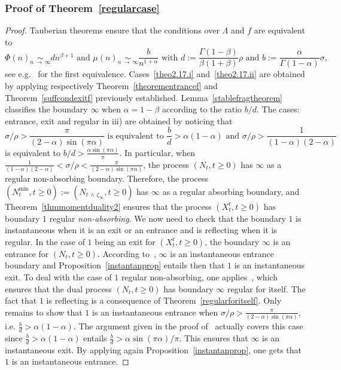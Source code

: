 \documentclass[10pt]{amsart}
\theoremstyle{definition}\newtheorem{defi}[theo]{Definition}\newtheorem{rema}[theo]{Remark}\newtheorem{exam}[theo]{Example}\newtheorem{exem}[theo]{Example}\newtheorem{nota}[theo]{Notation}
\newcommand{\rmr}{\mathrm{r}}
\begin{document}
\subsubsection{Proof of Theorem~\ref{regularcase}}
\begin{proof}
Tauberian theorems ensure that the conditions over $\Lambda$ and $f$ are equivalent to
\[
\Phi(n)\underset{n\,\rightarrow\,\infty}{\sim} d n^{\beta+1}
\text{ and }
\mu(n)\underset{n\,\rightarrow\,\infty}{\sim} \frac{b}{n^{1+\alpha}}\text{ with }d:=\frac{\Gamma(1-\beta)}{\beta(1+\beta)}\rho \text{ and } b:=\frac{\alpha}{\Gamma(1-\alpha)}\sigma,
\]
see e.g.~\cite[Section~2.2, p.~12]{cdiEFC} for the first equivalence. Cases~\eqref{theo2.17.i} and~\eqref{theo2.17.ii} are obtained by applying respectively Theorem~\ref{theorementrancef} and Theorem~\ref{suffcondexitf} previously established. Lemma~\ref{stablefragtheorem} classifies the boundary $\infty$ when $\alpha=1-\beta$ according to the ratio $b/d$. The cases: entrance, exit and regular in iii) are obtained by noticing that
\[
\sigma/\rho>\frac{\pi}{(2-\alpha)\sin(\pi \alpha)}\text{ is equivalent to }\frac{b}{d}>\alpha(1-\alpha)\text{ and }\sigma/\rho>\frac{1}{(1-\alpha)(2-\alpha)}
\]
is equivalent to $b/d>\frac{\alpha \sin(\pi \alpha)}{\pi}$. In particular, when $\frac{1}{(1-\alpha)(2-\alpha)}<\sigma/\rho<\frac{\pi}{(2-\alpha)\sin(\pi \alpha)}$, the process $(N_t,t\geq 0)$ has $\infty$ as a regular non-absorbing boundary. Therefore, the process $(N^{\min}_t,t\geq 0):=(N_{t\,\wedge\,\zeta_{\infty}},t\geq 0)$ has $\infty$ as a regular absorbing boundary, and Theorem~\ref{thmmomentduality2} ensures that the process $(X_t^{\rmr},t\geq 0)$ has boundary $1$ regular \emph{non-absorbing}. We now need to check that the boundary $1$ is instantaneous when it is an exit or an entrance and is reflecting when it is regular. In the case of $1$ being an exit for $(X_t^{\rmr},t\geq 0)$, the boundary $\infty$ is an entrance for $(N_t,t\geq 0)$. According to~\cite[Lemma~2.5]{cdiEFC}, $\infty$ is an instantaneous entrance boundary and Proposition~\ref{instantanprop} entails then that $1$ is an instantaneous exit. To deal with the case of $1$ regular non-absorbing, one applies~\cite[Proposition~3.7]{explosion}, which ensures that the dual process $(N_t,t\geq 0)$ has boundary $\infty$ regular for itself. The fact that $1$ is reflecting is a consequence of Theorem~\ref{regularforitself}. Only remains to show that $1$ is an instantaneous entrance when $\sigma/\rho>\frac{\pi}{(2-\alpha)\sin(\pi \alpha)}$, i.e. $\frac{b}{d}>\alpha(1-\alpha)$. The argument given in the proof of~\cite[Proposition~3.7]{explosion} actually covers this case since $\frac{b}{d}>\alpha(1-\alpha)$ entails $\frac{b}{d}>\alpha \sin(\pi \alpha)/\pi$. This ensures that $\infty$ is an instantaneous exit. By applying again Proposition~\ref{instantanprop}, one gets that $1$ is an instantaneous entrance.
\end{proof}
\end{document}
